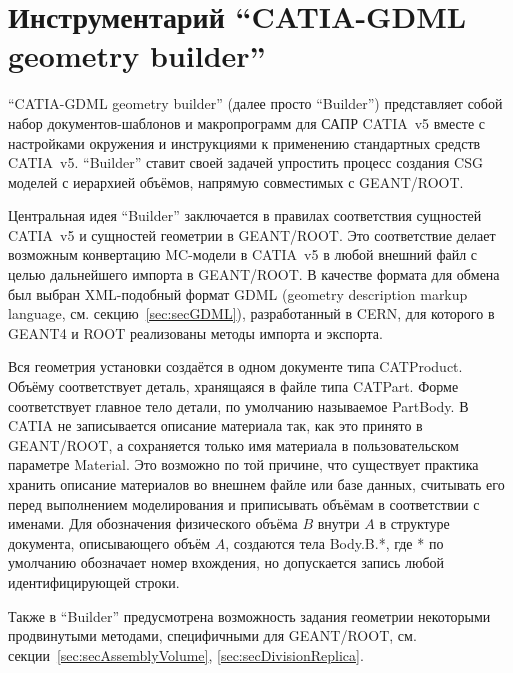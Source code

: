 \section{Инструментарий ``CATIA-GDML geometry builder''}\label{sec:secBuilder}

``CATIA-GDML geometry builder'' (далее просто ``Builder'') представляет собой набор документов-шаблонов и макропрограмм для САПР CATIA~v5 вместе с настройками окружения и инструкциями к применению стандартных средств CATIA~v5. ``Builder'' ставит своей задачей упростить процесс создания CSG моделей с иерархией объёмов, напрямую совместимых с GEANT/ROOT.

Центральная идея ``Builder'' заключается в правилах соответствия сущностей CATIA~v5 и сущностей геометрии в GEANT/ROOT. Это соответствие делает возможным конвертацию MC-модели в CATIA~v5 в любой внешний файл с целью дальнейшего импорта в GEANT/ROOT. В качестве формата для обмена был выбран XML-подобный формат GDML (geometry description markup language, см. секцию~\ref{sec:secGDML}), разработанный в CERN, для которого в GEANT4 и ROOT реализованы методы импорта и экспорта.

Вся геометрия установки создаётся в одном документе типа CATProduct. Объёму соответствует деталь, хранящаяся в файле типа CATPart. Форме соответствует главное тело детали, по умолчанию называемое PartBody. В CATIA не записывается описание материала так, как это принято в GEANT/ROOT, а сохраняется только имя материала в пользовательском параметре Material. Это возможно по той причине, что существует практика хранить описание материалов во внешнем файле или базе данных, считывать его перед выполнением моделирования и приписывать объёмам в соответствии с именами. Для обозначения физического объёма $B$ внутри $A$ в структуре документа, описывающего объём $A$, создаются тела Body.B.*, где * по умолчанию обозначает номер вхождения, но допускается запись любой идентифицирующей строки.

Также в ``Builder'' предусмотрена возможность задания геометрии некоторыми продвинутыми методами, специфичными для GEANT/ROOT, см. секции~\ref{sec:secAssemblyVolume}, \ref{sec:secDivisionReplica}.

